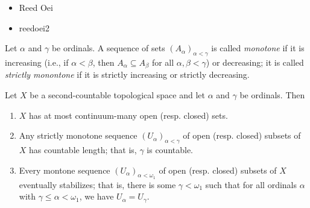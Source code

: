 \documentclass[10pt]{article}
\begin{document}
\begin{itemize}
    \item[] Reed Oei
    \item[] reedoei2
\end{itemize}

\begin{definition}
    Let $\alpha$ and $\gamma$ be ordinals.
    A sequence of sets $(A_{\alpha})_{\alpha < \gamma}$ is called \emph{monotone} if it is increasing (i.e., if $\alpha < \beta$, then $A_{\alpha} \subseteq A_{\beta}$ for all $\alpha, \beta < \gamma$) or decreasing; it is called \emph{strictly monontone} if it is strictly increasing or strictly decreasing.
\end{definition}

\begin{proposition}[Exercise 1]
    Let $X$ be a second-countable topological space and let $\alpha$ and $\gamma$ be ordinals.
    Then
    \begin{enumerate}[label=(\alph*)]
        \item $X$ has at most continuum-many open (resp. closed) sets.
        \item Any strictly monotone sequence $(U_{\alpha})_{\alpha < \gamma}$ of open (resp. closed) subsets of $X$ has countable length; that is, $\gamma$ is countable.
        \item Every montone sequence $(U_\alpha)_{\alpha < \omega_1}$ of open (resp. closed) subsets of $X$ eventually stabilizes; that is, there is some $\gamma < \omega_1$ such that for all ordinals $\alpha$ with $\gamma \leq \alpha < \omega_1$, we have $U_{\alpha} = U_{\gamma}$.
    \end{enumerate}
\end{proposition}
\end{document}
